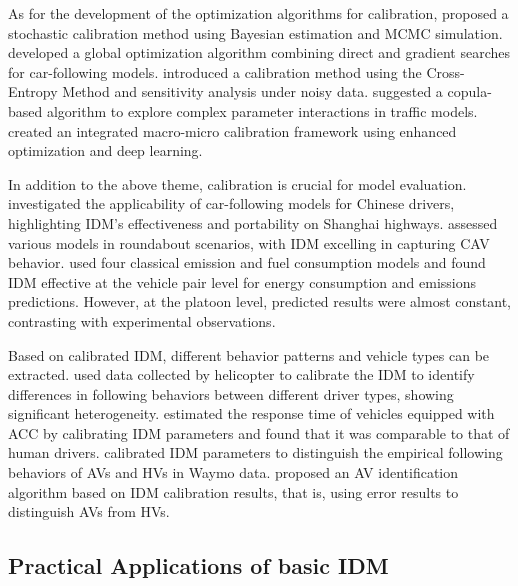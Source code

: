\documentclass[a4paper,fleqn]{cas-sc}
\begin{document}
As for the development of the optimization algorithms for calibration, \cite{rahman_improving_2015} proposed a stochastic calibration method using Bayesian estimation and MCMC simulation. \cite{liGlobalOptimizationAlgorithmTrajectory2016b} developed a global optimization algorithm combining direct and gradient searches for car-following models. \cite{zhongCrossEntropyMethodProbabilisticSensitivity2016b} introduced a calibration method using the Cross-Entropy Method and sensitivity analysis under noisy data.\cite{fardCopulaBasedEstimationDistributionAlgorithm2019b} suggested a copula-based algorithm to explore complex parameter interactions in traffic models.\cite{wangIntegratedSelfConsistentMacroMicroTraffic2024a} created an integrated macro-micro calibration framework using enhanced optimization and deep learning.

In addition to the above theme, calibration is crucial for model evaluation. \cite{zhuModelingCarFollowingBehaviorUrban2018b} investigated the applicability of car-following models for Chinese drivers, highlighting IDM's effectiveness and portability on Shanghai highways. \cite{campi_roundabouts_2024} assessed various models in roundabout scenarios, with IDM excelling in capturing CAV behavior. \cite{zhouExperimentalFeaturesEmissionsFuel2023b} used four classical emission and fuel consumption models and found IDM effective at the vehicle pair level for energy consumption and emissions predictions. However, at the platoon level, predicted results were almost constant, contrasting with experimental observations.

Based on calibrated IDM, different behavior patterns and vehicle types can be extracted. \cite{ossenHeterogeneityCarFollowingBehaviorTheory2011b} used data collected by helicopter to calibrate the IDM to identify differences in following behaviors between different driver types, showing significant heterogeneity. \cite{makridis_response_2020} estimated the response time of vehicles equipped with ACC by calibrating IDM parameters and found that it was comparable to that of human drivers. \cite{hu_autonomous_2023} calibrated IDM parameters to distinguish the empirical following behaviors of AVs and HVs in Waymo data. \cite{li_automated_2023} proposed an AV identification algorithm based on IDM calibration results, that is, using error results to distinguish AVs from HVs.

\subsection{Practical Applications of basic IDM}
\end{document}

